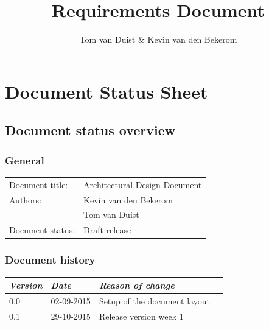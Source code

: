 

\title{Requirements Document}
\newcommand{\TitelAbbr}{RD}
\newcommand{\Version}{0.1}
\newcommand{\rreport}{Intermediate Requirements Engineering report}



\supervisors{}
\author{Tom van Duist \& Kevin van den Bekerom}





\maketitle


\tableofcontents

\chapter*{Document Status Sheet}
\section*{Document status overview}
\subsection*{General}
\begin{tabular}[!]{ll}
    Document title:     & Architectural Design Document\\
    Authors:           	& Kevin van den Bekerom \\ 
						& Tom van Duist \\
    Document status:    & Draft release\\
\end{tabular}

\subsection*{Document history}
\begin{tabular}[!]{|l|l|l|l|}
    \hline
    \emph{Version}    &   \emph{Date} &  \emph{Reason of change}\\
    \hline
    0.0 & 02-09-2015 &  Setup of the document layout\\    
    \hline
    0.1 & 29-10-2015 & Release version week 1 \\
    \hline
\end{tabular}

\clearpage

